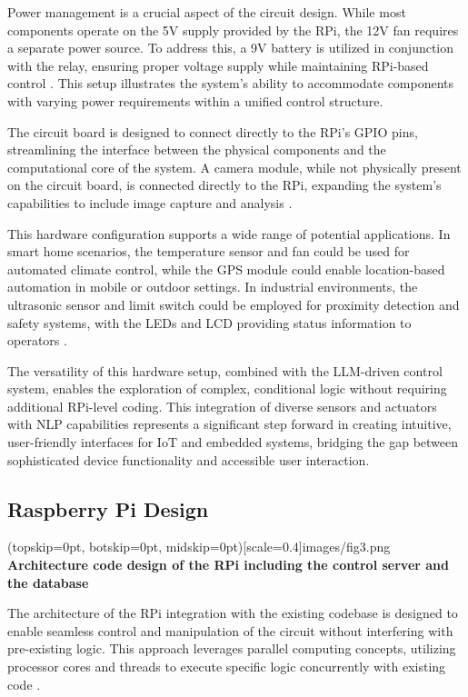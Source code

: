 \documentclass{ieeeaccess}
\begin{document}
Power management is a crucial aspect of the circuit design. While most components operate on the 5V supply provided by the RPi, the 12V fan requires a separate power source. To address this, a 9V battery is utilized in conjunction with the relay, ensuring proper voltage supply while maintaining RPi-based control \cite{monk2019}. This setup illustrates the system's ability to accommodate components with varying power requirements within a unified control structure.

The circuit board is designed to connect directly to the RPi's GPIO pins, streamlining the interface between the physical components and the computational core of the system. A camera module, while not physically present on the circuit board, is connected directly to the RPi, expanding the system's capabilities to include image capture and analysis \cite{pi_camera_2018}.

This hardware configuration supports a wide range of potential applications. In smart home scenarios, the temperature sensor and fan could be used for automated climate control, while the GPS module could enable location-based automation in mobile or outdoor settings. In industrial environments, the ultrasonic sensor and limit switch could be employed for proximity detection and safety systems, with the LEDs and LCD providing status information to operators \cite{mcmanus2021}.

The versatility of this hardware setup, combined with the LLM-driven control system, enables the exploration of complex, conditional logic without requiring additional RPi-level coding. This integration of diverse sensors and actuators with NLP capabilities represents a significant step forward in creating intuitive, user-friendly interfaces for IoT and embedded systems, bridging the gap between sophisticated device functionality and accessible user interaction.

\subsection{Raspberry Pi Design}

\Figure[t!](topskip=0pt, botskip=0pt,
midskip=0pt)[scale=0.4]{{images/fig3.png}}
{ \centering \textbf{Architecture code design of the RPi including the control server and the database}\label{fig3}}

The architecture of the RPi integration with the existing codebase is designed to enable seamless control and manipulation of the circuit without interfering with pre-existing logic. This approach leverages parallel computing concepts, utilizing processor cores and threads to execute specific logic concurrently with existing code \cite{wilkinson2005parallel}.
\end{document}
